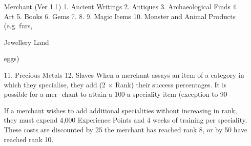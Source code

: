 \begin{Chapter}{Merchant (Ver 1.1)}
1.   Ancient Writings 
2.   Antiques 
3.   Archaeological Finds 
4.   Art 
5.   Books 
6.   Gems 
7.  
8.  
9.   Magic Items 
10.   Monster and Animal Products (e.g. furs, 

Jewellery 
Land 

eggs) 

11.   Precious Metals 
12.  Slaves 
When  a  merchant  assays  an  item  of  a  category  in 
which  they  specialise,  they  add  (2  ×  Rank)%
their  success percentages.  It  is  possible  for  a  mer-
chant to attain a 100%
a speciality item (exception to 90%

If  a  merchant  wishes  to  add  additional  specialities 
without increasing in rank, they must expend 4,000 
Experience  Points  and  4  weeks  of  training  per 
speciality.  These  costs  are  discounted  by  25%
the merchant has reached rank 8, or by 50%
have reached rank 10. 

\end{Chapter}

